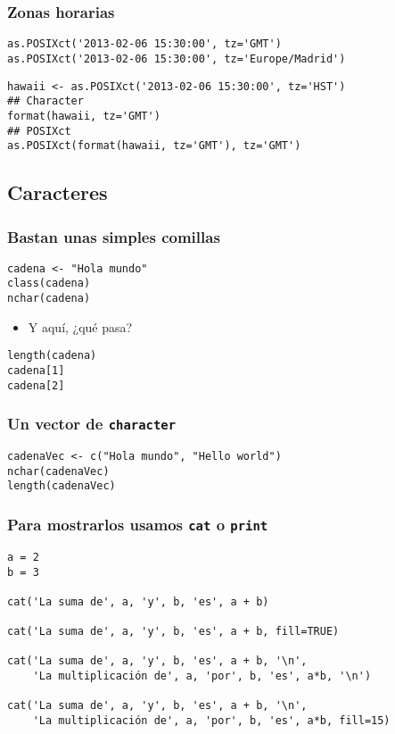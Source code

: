 \documentclass[xcolor={usenames,svgnames,dvipsnames}]{beamer}
\begin{document}
\begin{frame}[fragile]
\frametitle{Zonas horarias}
\label{sec-5-2-5}



\lstset{language=R}
\begin{lstlisting}
as.POSIXct('2013-02-06 15:30:00', tz='GMT')
as.POSIXct('2013-02-06 15:30:00', tz='Europe/Madrid')
\end{lstlisting}


\lstset{language=R}
\begin{lstlisting}
hawaii <- as.POSIXct('2013-02-06 15:30:00', tz='HST')
## Character
format(hawaii, tz='GMT')
## POSIXct
as.POSIXct(format(hawaii, tz='GMT'), tz='GMT')
\end{lstlisting}
\end{frame}
\subsection{Caracteres}
\label{sec-5-3}
\begin{frame}[fragile]
\frametitle{Bastan unas simples comillas}
\label{sec-5-3-1}



\lstset{language=R}
\begin{lstlisting}
cadena <- "Hola mundo"
class(cadena)
nchar(cadena)
\end{lstlisting}

\begin{itemize}
\item Y aquí, ¿qué pasa?
\end{itemize}

\lstset{language=R}
\begin{lstlisting}
length(cadena)
cadena[1]
cadena[2]
\end{lstlisting}
\end{frame}
\begin{frame}[fragile]
\frametitle{Un vector de \texttt{character}}
\label{sec-5-3-2}


\lstset{language=R}
\begin{lstlisting}
cadenaVec <- c("Hola mundo", "Hello world")
nchar(cadenaVec)
length(cadenaVec)
\end{lstlisting}
\end{frame}
\begin{frame}[fragile]
\frametitle{Para mostrarlos usamos \texttt{cat} o \texttt{print}}
\label{sec-5-3-3}



\lstset{language=R}
\begin{lstlisting}
a = 2
b = 3

cat('La suma de', a, 'y', b, 'es', a + b)

cat('La suma de', a, 'y', b, 'es', a + b, fill=TRUE)

cat('La suma de', a, 'y', b, 'es', a + b, '\n',
    'La multiplicación de', a, 'por', b, 'es', a*b, '\n')

cat('La suma de', a, 'y', b, 'es', a + b, '\n',
    'La multiplicación de', a, 'por', b, 'es', a*b, fill=15)
\end{lstlisting}
\end{frame}
\end{document}
